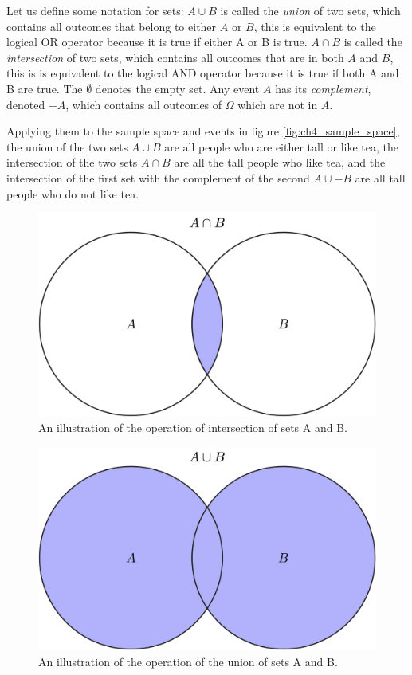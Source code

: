 \documentclass[
]{book}
\theoremstyle{definition}
\theoremstyle{definition}
\theoremstyle{definition}
\theoremstyle{remark}
\begin{document}
Let us define some notation for sets: \(A \cup B\) is called the \emph{union} of two sets, which contains all outcomes that belong to either \(A\) or \(B\), this is equivalent to the logical OR operator because it is true if either A or B is true. \(A\cap B\) is called the \emph{intersection} of two sets, which contains all outcomes that are in both \(A\) and \(B\), this is is equivalent to the logical AND operator because it is true if both A and B are true. The \(\emptyset\) denotes the empty set. Any event \(A\) has its \emph{complement}, denoted \(-A\), which contains all outcomes of \(\Omega\) which are not in \(A\).

Applying them to the sample space and events in figure \ref{fig:ch4_sample_space}, the union of the two sets \(A \cup B\) are all people who are either tall or like tea, the intersection of the two sets \(A\cap B\) are all the tall people who like tea, and the intersection of the first set with the complement of the second \(A \cup - B\) are all tall people who do not like tea.

\begin{figure}
\centering
\includegraphics{ch4/set_intersection.png}
\caption{An illustration of the operation of intersection of sets A and B.}
\end{figure}

\begin{figure}
\centering
\includegraphics{ch4/set_union.png}
\caption{An illustration of the operation of the union of sets A and B.}
\end{figure}
\end{document}
